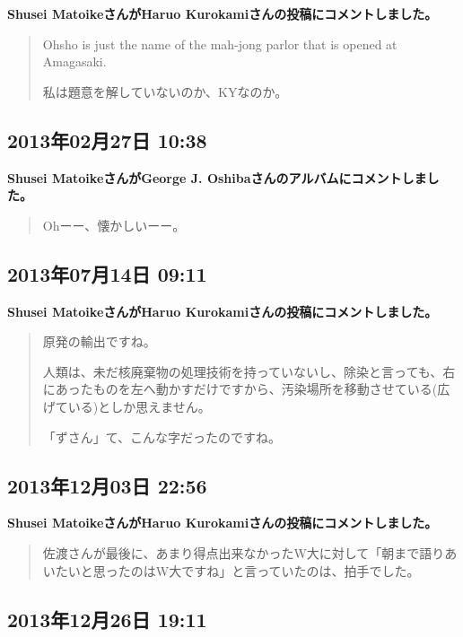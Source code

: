 \textbf{Shusei MatoikeさんがHaruo Kurokamiさんの投稿にコメントしました。}

\begin{quote}
Ohsho is just the name of the mah-jong parlor that is opened at Amagasaki.

私は題意を解していないのか、KYなのか。
\end{quote}

\subsection*{2013年02月27日 10:38}

\textbf{Shusei MatoikeさんがGeorge J. Oshibaさんのアルバムにコメントしました。}

\begin{quote}
Ohーー、懐かしいーー。
\end{quote}

\subsection*{2013年07月14日 09:11}

\textbf{Shusei MatoikeさんがHaruo Kurokamiさんの投稿にコメントしました。}

\begin{quote}
原発の輸出ですね。

人類は、未だ核廃棄物の処理技術を持っていないし、除染と言っても、右にあったものを左へ動かすだけですから、汚染場所を移動させている(広げている)としか思えません。

「ずさん」て、こんな字だったのですね。
\end{quote}

\subsection*{2013年12月03日 22:56}

\textbf{Shusei MatoikeさんがHaruo Kurokamiさんの投稿にコメントしました。}

\begin{quote}
佐渡さんが最後に、あまり得点出来なかったW大に対して「朝まで語りあいたいと思ったのはW大ですね」と言っていたのは、拍手でした。
\end{quote}

\subsection*{2013年12月26日 19:11}

